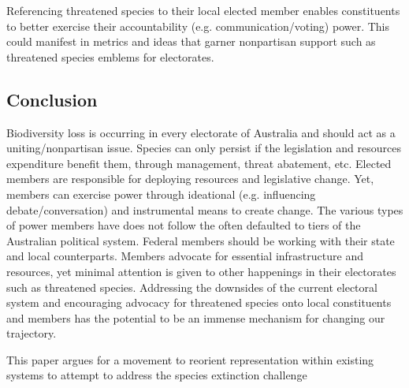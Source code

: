 \documentclass[a4paper,11pt]{article}
\begin{document}

Referencing threatened species to their local elected member enables constituents to better exercise their accountability (e.g. communication/voting) power. This could manifest in metrics and ideas that garner nonpartisan support such as threatened species emblems for electorates. 




\subsection{Conclusion}

Biodiversity loss is occurring in every electorate of Australia and should act as a uniting/nonpartisan issue. Species can only persist if the legislation and resources expenditure benefit them, through management, threat abatement, etc. Elected members are responsible for deploying resources and legislative change. Yet, members can exercise power through ideational (e.g. influencing debate/conversation) and instrumental means to create change. The various types of power members have does not follow the often defaulted to tiers of the Australian political system. Federal members should be working with their state and local counterparts. Members advocate for essential infrastructure and resources, yet minimal attention is given to other happenings in their electorates such as threatened species. Addressing the downsides of the current electoral system and encouraging advocacy for threatened species onto local constituents and members has the potential to be an immense mechanism for changing our trajectory.

This paper argues for a movement to reorient representation within existing systems to attempt to address the species extinction challenge \cite{burkeSpeciesBordersPolitical2020}
\end{document}
